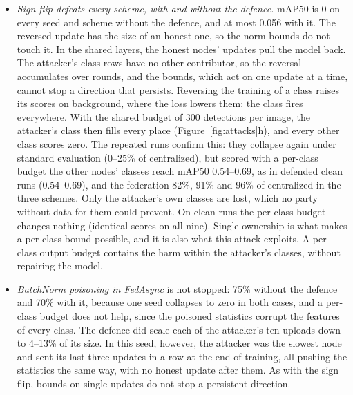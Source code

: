 \documentclass[pdflatex,sn-mathphys-num]{sn-jnl}
\begin{document}
\begin{itemize}
\item \emph{Sign flip defeats every scheme, with and without the defence.} mAP50 is 0 on every seed and scheme without the defence, and at most 0.056 with it. The reversed update has the size of an honest one, so the norm bounds do not touch it. In the shared layers, the honest nodes' updates pull the model back. The attacker's class rows have no other contributor, so the reversal accumulates over rounds, and the bounds, which act on one update at a time, cannot stop a direction that persists. Reversing the training of a class raises its scores on background, where the loss lowers them: the class fires everywhere. With the shared budget of 300 detections per image, the attacker's class then fills every place (Figure~\ref{fig:attacks}h), and every other class scores zero. The repeated runs confirm this: they collapse again under standard evaluation (0--25\% of centralized), but scored with a per-class budget the other nodes' classes reach mAP50 0.54--0.69, as in defended clean runs (0.54--0.69), and the federation 82\%, 91\% and 96\% of centralized in the three schemes. Only the attacker's own classes are lost, which no party without data for them could prevent. On clean runs the per-class budget changes nothing (identical scores on all nine). Single ownership is what makes a per-class bound possible, and it is also what this attack exploits. A per-class output budget contains the harm within the attacker's classes, without repairing the model.
\item \emph{BatchNorm poisoning in FedAsync} is not stopped: 75\% without the defence and 70\% with it, because one seed collapses to zero in both cases, and a per-class budget does not help, since the poisoned statistics corrupt the features of every class. The defence did scale each of the attacker's ten uploads down to 4--13\% of its size. In this seed, however, the attacker was the slowest node and sent its last three updates in a row at the end of training, all pushing the statistics the same way, with no honest update after them. As with the sign flip, bounds on single updates do not stop a persistent direction.
\end{itemize}
\end{document}
